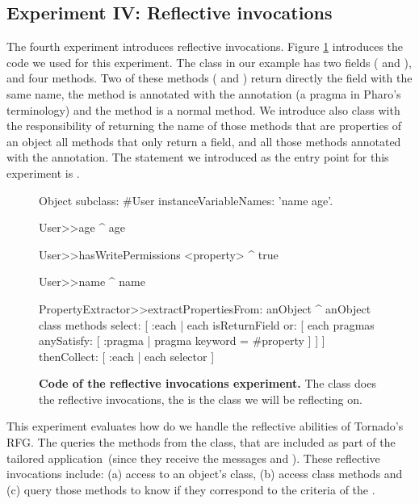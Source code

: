 \subsection*{Experiment IV: Reflective invocations} \label{sec:results_helloworld}

The fourth experiment introduces reflective invocations. Figure \ref{fig:reflective_invocations} introduces the code we used for this experiment. The  class in our example has two fields ( and ), and four methods. Two of these methods ( and ) return directly the field with the same name, the method  is annotated with the  annotation (a pragma in Pharo's terminology) and the method  is a normal method. We introduce also  class with the responsibility of returning the name of those methods that are properties of an object \ie all methods that only return a field, and all those methods annotated with the  annotation. The statement we introduced as the entry point for this experiment is .

\begin{figure}[ht]
\small
\begin{code}
Object subclass: #User
	instanceVariableNames: 'name age'.

User>>age
	^ age

User>>hasWritePermissions
	<property>
	^ true

User>>name
	^ name

PropertyExtractor>>extractPropertiesFrom: anObject
	^ anObject class methods
		select: [ :each | each isReturnField
			or: [ each pragmas anySatisfy: [ :pragma | pragma keyword = #property ] ] ]
		thenCollect: [ :each | each selector ]

\end{code}
\caption{\small \textbf{Code of the reflective invocations experiment.} The  class does the reflective invocations, the  is the class we will be reflecting on.\label{fig:reflective_invocations}}
\end{figure}

This experiment evaluates how do we handle the reflective abilities of Tornado's RFG. The  queries the methods from the  class, that are included as part of the tailored application~(since they receive the messages  and ). These reflective invocations include: (a) access to an object's class, (b) access class methods and (c) query those methods to know if they correspond to the criteria of the .

